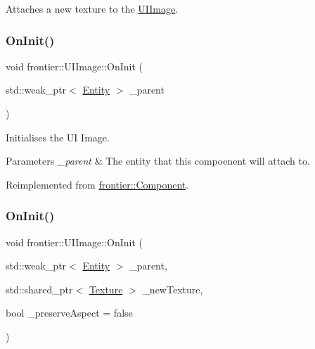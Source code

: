 Attaches a new texture to the \hyperlink{classfrontier_1_1_u_i_image}{U\+I\+Image}. 

\mbox{\label{classfrontier_1_1_u_i_image_ad862e7dd5bcd1c2847001f5e1b56c114}} 
\subsubsection{\texorpdfstring{On\+Init()}{OnInit()}\hspace{0.1cm}{\footnotesize\ttfamily [1/2]}}
{\footnotesize\ttfamily void frontier\+::\+U\+I\+Image\+::\+On\+Init (\begin{DoxyParamCaption}\item[{std\+::weak\+\_\+ptr$<$ \hyperlink{classfrontier_1_1_entity}{Entity} $>$}]{\+\_\+parent }\end{DoxyParamCaption})\hspace{0.3cm}{\ttfamily [virtual]}}



Initialises the UI Image. 


\begin{DoxyParams}{Parameters}
{\em \+\_\+parent} & The entity that this compoenent will attach to. \\
\hline
\end{DoxyParams}


Reimplemented from \hyperlink{classfrontier_1_1_component_af3da02905c4d79219d9b12f260a35ad1}{frontier\+::\+Component}.

\mbox{\label{classfrontier_1_1_u_i_image_a0f5014ae8334ecb692c34c1645a3c6be}} 
\subsubsection{\texorpdfstring{On\+Init()}{OnInit()}\hspace{0.1cm}{\footnotesize\ttfamily [2/2]}}
{\footnotesize\ttfamily void frontier\+::\+U\+I\+Image\+::\+On\+Init (\begin{DoxyParamCaption}\item[{std\+::weak\+\_\+ptr$<$ \hyperlink{classfrontier_1_1_entity}{Entity} $>$}]{\+\_\+parent,  }\item[{std\+::shared\+\_\+ptr$<$ \hyperlink{classfrontier_1_1_texture}{Texture} $>$}]{\+\_\+new\+Texture,  }\item[{bool}]{\+\_\+preserve\+Aspect = {\ttfamily false} }\end{DoxyParamCaption})}



